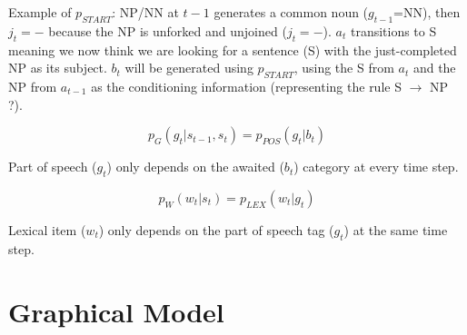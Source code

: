 \documentclass[12pt]{article}
\begin{document}
Example of $p_{START}$: NP/NN at $t-1$ generates a common noun ($g_{t-1}$=NN), then $j_t=-$ because the NP is unforked and unjoined ($j_t=-$). $a_t$ transitions to S meaning we now think we are looking for a sentence (S) with the just-completed NP as its subject. $b_{t}$ will be generated using $p_{START}$, using the S from $a_t$ and the NP from $a_{t-1}$ as the conditioning information (representing the rule S $\rightarrow$ NP ?).

\begin{equation}
p_{G}(g_t | s_{t-1},s_t) = p_{POS}(g_t|b_t)
\end{equation}

Part of speech ($g_t$) only depends on the awaited ($b_t$) category at every time step.

\begin{equation}
p_{W}(w_t|s_t) = p_{LEX}(w_t | g_t)
\end{equation}

Lexical item ($w_t$) only depends on the part of speech tag ($g_t$) at the same time step.

\section{Graphical Model}
\end{document}
